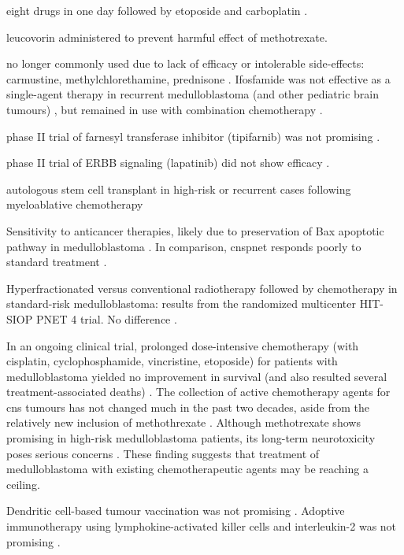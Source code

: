 eight drugs in one day followed by etoposide and carboplatin .

leucovorin administered to prevent harmful effect of methotrexate.

no longer commonly used due to lack of efficacy or intolerable side-effects:
carmustine, methylchlorethamine, prednisone . Ifosfamide was not effective as a single-agent therapy in recurrent medulloblastoma (and other pediatric brain tumours) , but remained in use with combination chemotherapy .

phase II trial of farnesyl transferase inhibitor (tipifarnib) was not promising .

phase II trial of ERBB signaling (lapatinib) did not show efficacy .


autologous stem cell transplant in high-risk or recurrent cases following myeloablative chemotherapy 

Sensitivity to anticancer therapies, likely due to preservation of Bax apoptotic pathway in medulloblastoma .
In comparison, \gls{cnspnet} responds poorly to standard treatment .

Hyperfractionated versus conventional radiotherapy followed by chemotherapy in standard-risk medulloblastoma: results from the randomized multicenter HIT-SIOP PNET 4 trial. No difference .

In an ongoing clinical trial, prolonged dose-intensive chemotherapy (with cisplatin, cyclophosphamide, vincristine, etoposide) for patients with medulloblastoma yielded no improvement in survival (and also resulted several treatment-associated deaths) . The collection of active chemotherapy agents for \gls{cns} tumours has not changed much in the past two decades, aside from the relatively new inclusion of methothrexate . Although methotrexate shows promising in high-risk medulloblastoma patients, its long-term neurotoxicity poses serious concerns . These finding suggests that treatment of medulloblastoma with existing chemotherapeutic agents may be reaching a ceiling.

Dendritic cell-based tumour vaccination was not promising .
Adoptive immunotherapy using lymphokine-activated killer cells and interleukin-2 was not promising .

